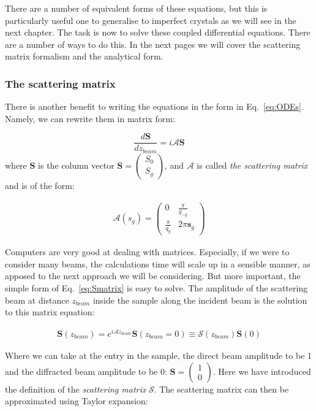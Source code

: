 There are a number of equivalent forms of these equations, but this is particularly useful one to generalise to imperfect crystals as we will see in the next chapter. The task is now to solve these coupled differential equations. There are a number of ways to do this.  In the next pages we will cover  the scattering matrix formalism and the analytical form. 


\subsubsection{The scattering matrix}
There is another benefit to writing the equations in the form in Eq.~\ref{eq:ODEs}. Namely, we can rewrite them in matrix form:

\begin{equation}
\label{eq:Smatrix}
     \frac{d \textbf{S}}{dz_{beam}} = i \mathcal{A} \textbf{S} 
\end{equation}
where $\textbf{S}$ is the column vector $\mathbf{S} = \begin{pmatrix}S_0\\ S_g\end{pmatrix}$, and $\mathcal{A}$ is called \textit{the scattering matrix }and is of the form: 

\begin{align}
\mathcal{A}(s_g)=  \begin{pmatrix} 
0 & \frac{\pi}{q_{-g}} \\
\frac{\pi}{q_g} & 2\pi \textbf{s}_g 
\end{pmatrix}
\end{align}

Computers are very good at dealing with matrices. Especially, if we were to consider many beams, the calculations time will scale up in a sensible manner, as apposed to the next approach we will be considering. But more important, the simple form of Eq.~\ref{eq:Smatrix} is easy to solve. The  amplitude of the scattering beam at distance $z_{beam}$ inside the sample along the incident beam is the solution to this matrix equation:

\begin{align}
\mathbf{S}(z_{beam})=e^{i \mathcal{A} z_{beam}}\mathbf{S}(z_{beam}=0)\equiv \mathcal{S}(z_{beam})\mathbf{S}(0)
\end{align} 

Where we can take at the entry in the sample, the direct beam amplitude to be 1 and the diffracted beam amplitude to be 0: $\mathbf{S} = \begin{pmatrix}1\\ 0\end{pmatrix}$. Here we have introduced the definition of the \textit{scattering matrix} $\mathcal{S}$. The scattering matrix can then be approximated using Taylor expansion:

